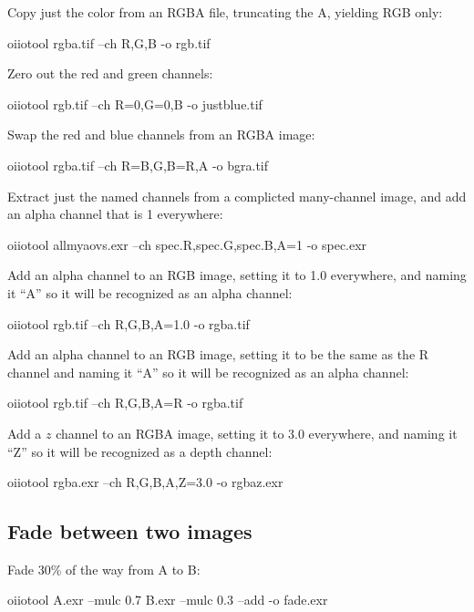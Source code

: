 \noindent Copy just the color from an RGBA file, truncating the A,
yielding RGB only:
\begin{code}
    oiiotool rgba.tif --ch R,G,B -o rgb.tif
\end{code}

\noindent Zero out the red and green channels:
\begin{code}
    oiiotool rgb.tif --ch R=0,G=0,B -o justblue.tif
\end{code}

\noindent Swap the red and blue channels from an RGBA image:
\begin{code}
    oiiotool rgba.tif --ch R=B,G,B=R,A -o bgra.tif
\end{code}

\noindent Extract just the named channels from a complicted many-channel
image, and add an alpha channel that is 1 everywhere:
\begin{code}
    oiiotool allmyaovs.exr --ch spec.R,spec.G,spec.B,A=1 -o spec.exr
\end{code}

\noindent Add an alpha channel to an RGB image, setting it to 1.0 everywhere,
and naming it ``A'' so it will be recognized as an alpha channel:
\begin{code}
    oiiotool rgb.tif --ch R,G,B,A=1.0 -o rgba.tif
\end{code}

\noindent Add an alpha channel to an RGB image, setting it to be the same
as the R channel and naming it ``A'' so it will be recognized as an alpha channel:
\begin{code}
    oiiotool rgb.tif --ch R,G,B,A=R -o rgba.tif
\end{code}

\noindent Add a $z$ channel to an RGBA image, setting it to 3.0 everywhere,
and naming it ``Z'' so it will be recognized as a depth channel:
\begin{code}
    oiiotool rgba.exr --ch R,G,B,A,Z=3.0 -o rgbaz.exr
\end{code}


\subsection*{Fade between two images}

\noindent Fade 30\% of the way from A to B:

\begin{code}
    oiiotool A.exr --mulc 0.7 B.exr --mulc 0.3 --add -o fade.exr
\end{code}


